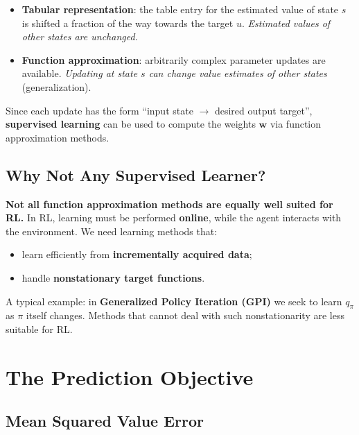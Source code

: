 \documentclass[11pt,a4paper]{article}
\theoremstyle{definition}
\theoremstyle{plain}
\theoremstyle{remark}
\begin{document}
\begin{tcolorbox}[colback=blue!5!white, colframe=blue!60!black, title={Tabular vs Function-Approximation Updates}]
\begin{itemize}
    \item \textbf{Tabular representation}: the table entry for the estimated value of state $s$ is shifted a fraction of the way towards the target $u$. \emph{Estimated values of other states are unchanged.}
    \item \textbf{Function approximation}: arbitrarily complex parameter updates are available. \emph{Updating at state $s$ can change value estimates of other states} (generalization).
\end{itemize}
\end{tcolorbox}

Since each update has the form ``input state $\to$ desired output target'', \textbf{supervised learning} can be used to compute the weights $\mathbf{w}$ via function approximation methods.

\subsection{Why Not Any Supervised Learner?}

\textbf{Not all function approximation methods are equally well suited for RL.} In RL, learning must be performed \textbf{online}, while the agent interacts with the environment. We need learning methods that:
\begin{itemize}
    \item learn efficiently from \textbf{incrementally acquired data};
    \item handle \textbf{nonstationary target functions}.
\end{itemize}

A typical example: in \textbf{Generalized Policy Iteration (GPI)} we seek to learn $q_\pi$ as $\pi$ itself changes. Methods that cannot deal with such nonstationarity are less suitable for RL.

\section{The Prediction Objective}

\subsection{Mean Squared Value Error}
\end{document}
